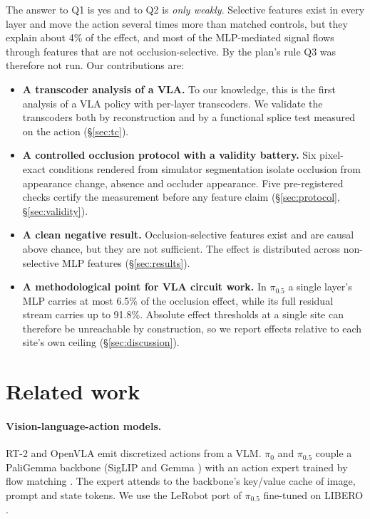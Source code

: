 \documentclass{article} %
\newcommand{\pifive}{$\pi_{0.5}$}
\begin{document}
The answer to Q1 is yes and to Q2 is \emph{only weakly}. Selective features exist in every layer and move the action several times more than matched controls, but they explain about 4\% of the effect, and most of the MLP-mediated signal flows through features that are not occlusion-selective. By the plan's rule Q3 was therefore not run. Our contributions are:
\begin{itemize}[leftmargin=*,itemsep=1pt,topsep=2pt]
  \item \textbf{A transcoder analysis of a VLA.} To our knowledge, this is the first analysis of a VLA policy with per-layer transcoders. We validate the transcoders both by reconstruction and by a functional splice test measured on the action (\S\ref{sec:tc}).
  \item \textbf{A controlled occlusion protocol with a validity battery.} Six pixel-exact conditions rendered from simulator segmentation isolate occlusion from appearance change, absence and occluder appearance. Five pre-registered checks certify the measurement before any feature claim (\S\ref{sec:protocol}, \S\ref{sec:validity}).
  \item \textbf{A clean negative result.} Occlusion-selective features exist and are causal above chance, but they are not sufficient. The effect is distributed across non-selective MLP features (\S\ref{sec:results}).
  \item \textbf{A methodological point for VLA circuit work.} In \pifive{} a single layer's MLP carries at most 6.5\% of the occlusion effect, while its full residual stream carries up to 91.8\%. Absolute effect thresholds at a single site can therefore be unreachable by construction, so we report effects relative to each site's own ceiling (\S\ref{sec:discussion}).
\end{itemize}

\section{Related work}
\label{sec:related}

\paragraph{Vision-language-action models.} RT-2 \citep{brohan2023rt2} and OpenVLA \citep{kim2024openvla} emit discretized actions from a VLM. $\pi_0$ \citep{black2024pi0} and \pifive{} \citep{pi2025pi05} couple a PaliGemma backbone (SigLIP \citep{zhai2023siglip} and Gemma \citep{gemma2024}) with an action expert trained by flow matching \citep{lipman2023flow}. The expert attends to the backbone's key/value cache of image, prompt and state tokens. We use the LeRobot port of \pifive{} \citep{cadene2024lerobot} fine-tuned on LIBERO \citep{liu2023libero}.
\end{document}
